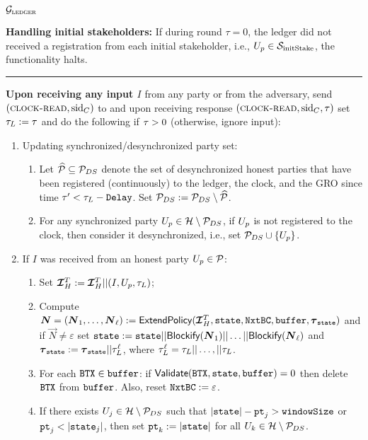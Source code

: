 \begin{systembox}{$\mathcal{G}_{\textsc{ledger}}$}
	\medskip
	
	{\bf Handling initial stakeholders:}
	If during round $\tau = 0$, the ledger did not received a registration from each initial stakeholder, i.e., ${U_p} \in \mathcal{S}_\mathrm{initStake}$, the functionality halts.
	
	\medskip
	\hrule
	\medskip
	
	{\bf Upon receiving any input $I$} from any party or from the adversary, send
	$(\textsc{clock-read}, \text{sid}_C)$ to \Fclock and upon receiving response $(\textsc{clock-read},
	\text{sid}_C, \tau)$ set $\tau_L:=\tau$ and do the following if $\tau > 0$ (otherwise, ignore input):
	
	\begin{enumerate}\setlength\itemsep{1.5ex}
		\item Updating synchronized/desynchronized party set: 
			\begin{enumerate}
			\item Let $\widehat{\mathcal{P}}\subseteq\mathcal{P}_{DS}$  denote the set of desynchronized honest parties that have been registered (continuously) to the ledger, the clock, and the GRO since time $\tau' < \tau_L-\texttt{Delay}$. Set $\mathcal{P}_{DS}:=\mathcal{P}_{DS}\setminus\widehat{\mathcal{P}}$.
		        \item For any synchronized party ${U_p}\in\mathcal{H}\setminus\mathcal{P}_{DS}$, if ${U_p}$ is not registered to the clock, then consider it desynchronized, i.e., set $\mathcal{P}_{DS}\cup\{{U_p}\}$. 
		        \end{enumerate}
		\item If  $I$ was received from an honest party ${U_p}\in\mathcal{P}$:\\[1ex]
		\begin{enumerate}\setlength\itemsep{1ex}
			\item Set  $\TIH:=\TIH||(I,\party,\LFtau)$; 
			\item Compute $\vec{N}=(\vec{N}_1,\ldots,\vec{N}_\ell):=\LFextend(\TIH,\state,\cbuffer,\buffer,\tlast)$ and if $\vec{N}\neq\varepsilon$ set $\state:=\state||\LFblockify(\vec{N}_1)||\ldots||\LFblockify(\vec{N}_\ell)$ and $
			\tlast:=\tlast||\LFtau^\ell$, where $\tau_L^\ell=\tau_L||\ldots,||\tau_L$.
			\item For each $\texttt{BTX}\in\texttt{buffer}$: if $\textsf{Validate}(\texttt{BTX},\texttt{state},\texttt{buffer})=0$ then delete  $\texttt{BTX}$ from $\texttt{buffer}$.  
			Also, reset $\texttt{NxtBC}:= \varepsilon$.
			\item If there exists $U_{j}\in\mathcal{H}\setminus\mathcal{P}_{DS}$ such that  $|\texttt{state}| -\texttt{pt}_{j} > \texttt{windowSize}$ or $\texttt{pt}_{j} < |\texttt{state}_{j}|$, then set  $\texttt{pt}_{k}:=|\texttt{state}|$ for all $U_{k}\in\mathcal{H}\setminus\mathcal{P}_{DS}$.
		\end{enumerate}
		

\end{enumerate}
\end{systembox}
